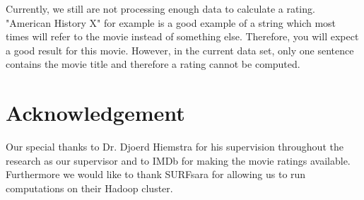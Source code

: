 \documentclass{sig-alternate-br}
\begin{document}
Currently, we still are not processing enough data to calculate a rating. "American History X" for example is a good example of a string which most times will refer to the movie instead of something else. Therefore, you will expect a good result for this movie. However, in the current data set, only one sentence contains the movie title and therefore a rating cannot be computed.

\section{Acknowledgement}
Our special thanks to Dr. Djoerd Hiemstra for his supervision throughout the research as our supervisor and to IMDb for making the movie ratings available. Furthermore we would like to thank SURFsara for allowing us to run computations on their Hadoop cluster.
%




\balancecolumns

\onecolumn
\end{document}
